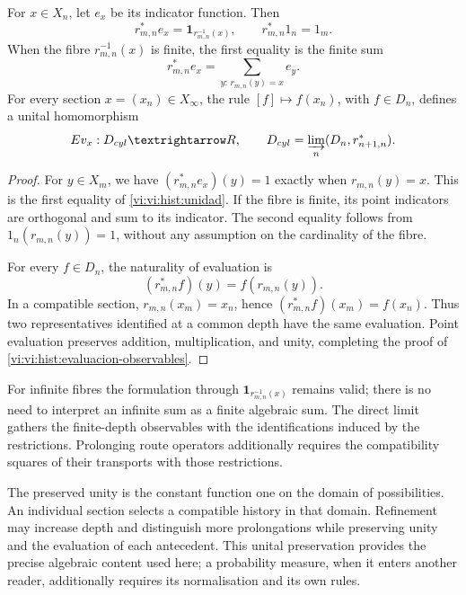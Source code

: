 \begin{lemma}
For \(x\in X_n\), let \(e_x\) be its indicator function. Then
\begin{equation}
 r_{m,n}^*e_x=\mathbf1_{r_{m,n}^{-1}(x)},\qquad
 r_{m,n}^*1_n=1_m.
 \label{vi:vi:hist:unidad}
\end{equation}
When the fibre \(r_{m,n}^{-1}(x)\) is finite, the first equality is
the finite sum
\[
 r_{m,n}^*e_x=\sum_{y:\,r_{m,n}(y)=x}e_y.
\]
For every section \(x=(x_n)\in X_\infty\), the rule
\([f]\mapsto f(x_n)\), with \(f\in D_n\), defines a unital
homomorphism
\begin{equation}
 \operatorname{Ev}_x:D_{\mathrm{cyl}}\longrightarrow\mathbb R,
 \qquad
 D_{\mathrm{cyl}}=\varinjlim_n(D_n,r_{n+1,n}^*).
 \label{vi:vi:hist:evaluacion-observables}
\end{equation}
\end{lemma}
\begin{proof}
For \(y\in X_m\), we have
\((r_{m,n}^*e_x)(y)=1\) exactly when \(r_{m,n}(y)=x\).
This is the first equality of \eqref{vi:vi:hist:unidad}. If the fibre is
finite, its point indicators are orthogonal and sum to its indicator.
The second equality follows from \(1_n(r_{m,n}(y))=1\), without any
assumption on the cardinality of the fibre.

For every \(f\in D_n\), the naturality of evaluation is
\[
 (r_{m,n}^*f)(y)=f(r_{m,n}(y)).
\]
In a compatible section, \(r_{m,n}(x_m)=x_n\), hence
\((r_{m,n}^*f)(x_m)=f(x_n)\). Thus two representatives identified
at a common depth have the same evaluation.
Point evaluation preserves addition, multiplication, and unity, completing
the proof of \eqref{vi:vi:hist:evaluacion-observables}.
\end{proof}

For infinite fibres the formulation through
\(\mathbf1_{r_{m,n}^{-1}(x)}\) remains valid; there is no need to interpret an
infinite sum as a finite algebraic sum. The direct limit gathers the
finite-depth observables with the identifications induced by
the restrictions. Prolonging route operators additionally requires
the compatibility squares of their transports with those restrictions.

The preserved unity is the constant function one on the domain of
possibilities. An individual section selects a compatible history
in that domain. Refinement may increase depth and distinguish
more prolongations while preserving unity and the evaluation of each
antecedent. This unital preservation provides the precise algebraic content
used here; a probability measure, when it enters
another reader, additionally requires its normalisation and its own rules.

